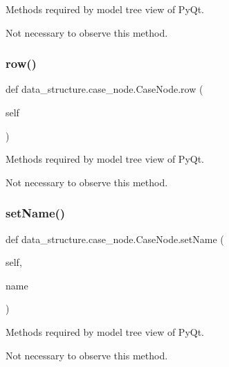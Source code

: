 Methods required by model tree view of Py\+Qt. 

Not necessary to observe this method. \hypertarget{classdata__structure_1_1case__node_1_1_case_node_a5ffe67a35812f868b49b833deeae9e60}{}\label{classdata__structure_1_1case__node_1_1_case_node_a5ffe67a35812f868b49b833deeae9e60} 
\subsubsection{\texorpdfstring{row()}{row()}}
{\footnotesize\ttfamily def data\+\_\+structure.\+case\+\_\+node.\+Case\+Node.\+row (\begin{DoxyParamCaption}\item[{}]{self }\end{DoxyParamCaption})}



Methods required by model tree view of Py\+Qt. 

Not necessary to observe this method. \hypertarget{classdata__structure_1_1case__node_1_1_case_node_ae3f38c3ce20582e74e659a1657282c0e}{}\label{classdata__structure_1_1case__node_1_1_case_node_ae3f38c3ce20582e74e659a1657282c0e} 
\subsubsection{\texorpdfstring{set\+Name()}{setName()}}
{\footnotesize\ttfamily def data\+\_\+structure.\+case\+\_\+node.\+Case\+Node.\+set\+Name (\begin{DoxyParamCaption}\item[{}]{self,  }\item[{}]{name }\end{DoxyParamCaption})}



Methods required by model tree view of Py\+Qt. 

Not necessary to observe this method. \hypertarget{classdata__structure_1_1case__node_1_1_case_node_a9eb860e45595b4a1c4d018c259d9d930}{}\label{classdata__structure_1_1case__node_1_1_case_node_a9eb860e45595b4a1c4d018c259d9d930} 
